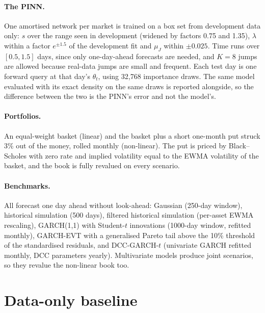 \paragraph{The PINN.} One amortised network per market is trained on a box set from development data only:
$s$ over the range seen in development (widened by factors 0.75 and 1.35), $\lambda$ within a factor $e^{\pm1.5}$ of
the development fit and $\mu_J$ within $\pm 0.025$. Time runs over $[0.5, 1.5]$ days, since only one-day-ahead
forecasts are needed, and $K = 8$ jumps are allowed because real-data jumps are small and frequent. Each test day
is one forward query at that day's $\theta_t$, using 32{,}768 importance draws. The same model evaluated with its
exact density on the same draws is reported alongside, so the difference between the two is the PINN's error
and not the model's.

\paragraph{Portfolios.} An equal-weight basket (linear) and the basket plus a short one-month put struck 3\%
out of the money, rolled monthly (non-linear). The put is priced by Black--Scholes with zero rate and implied
volatility equal to the EWMA volatility of the basket, and the book is fully revalued on every scenario.

\paragraph{Benchmarks.} All forecast one day ahead without look-ahead: Gaussian (250-day window), historical
simulation (500 days), filtered historical simulation (per-asset EWMA rescaling), GARCH(1,1) with Student-$t$
innovations (1000-day window, refitted monthly), GARCH-EVT \citep{mcneil2000} with a generalised Pareto tail
above the 10\% threshold of the standardised residuals, and DCC-GARCH-$t$ (univariate GARCH refitted monthly,
DCC parameters yearly). Multivariate models produce joint scenarios, so they revalue the non-linear book too.

\section{Data-only baseline}
\label{sec:met-dataonly}

